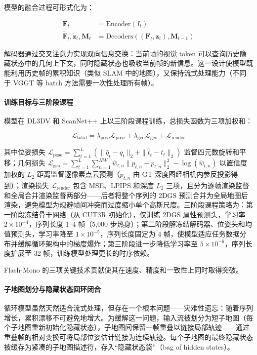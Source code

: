 模型的融合过程可形式化为：

\begin{align}
\mathbf{F}_t &= \mathrm{Encoder}(I_t) \\
\tilde{\mathbf{F}}_t, \tilde{\mathbf{z}}_t, \mathbf{M}_t &= \mathrm{Decoders}((\mathbf{F}_t, \mathbf{z}_t), \mathbf{M}_{t-1})
\end{align}

解码器通过交叉注意力实现双向信息交换：当前帧的视觉 token 可以查询历史隐藏状态中的几何上下文，同时隐藏状态也吸收当前帧的新信息。这一设计使模型既能利用历史帧的累积知识（类似 SLAM 中的地图），又保持流式处理能力（不同于 VGGT 等 batch 方法需要一次性处理所有帧）。

\paragraph{训练目标与三阶段课程}模型在 DL3DV 和 ScanNet++ 上以三阶段课程训练，总损失函数为三项加权和：

\begin{equation}
\mathcal{L}_{\mathrm{total}} = \lambda_{\mathrm{pose}}\mathcal{L}_{\mathrm{pose}} + \lambda_{\mathrm{geo}}\mathcal{L}_{\mathrm{geo}} + \mathcal{L}_{\mathrm{render}}
\end{equation}

其中位姿损失 $\mathcal{L}_{\mathrm{pose}} = \sum_{t=1}^{L}(\|\hat{q}_t - q_t\|_2 + \|\hat{t}_t - t_t\|_2)$ 监督四元数旋转和平移；几何损失 $\mathcal{L}_{\mathrm{geo}} = \sum_{t=1}^{L}\sum_{n=1}^{HW}\hat{w}_{t,n}\|\hat{p}_{t,n} - p_{t,n}\|_2^2 - \log(\hat{w}_{t,n})$ 以置信度加权的 $L_2$ 距离监督逐像素点云预测（$p_{t,n}$ 由 GT 深度图经相机内参反投影得到）；渲染损失 $\mathcal{L}_{\mathrm{render}}$ 包含 MSE、LPIPS 和深度 $L_2$ 三项，且分为逐帧渲染监督和全局合并渲染监督两部分——后者将整个序列的 2DGS 预测合并为全局地图后渲染，避免模型为规避帧间冲突而过度缩小单个高斯尺度。三阶段课程策略为：第一阶段冻结骨干网络（从 CUT3R 初始化），仅训练 2DGS 属性预测头，学习率 $2 \times 10^{-4}$，序列长度 1--4 帧（5,000 步热身）；第二阶段解冻结解码器、位姿头和均值预测头，学习率降至 $1 \times 10^{-5}$，序列长度固定为 4 帧，使模型适应任务数据分布并缓解循环架构中的梯度爆炸；第三阶段进一步降低学习率至 $5 \times 10^{-6}$，序列长度扩展至 32 帧，训练模型处理更长的时序依赖。

Flash-Mono 的三项关键技术贡献使其在速度、精度和一致性上同时取得突破。

\paragraph{子地图划分与隐藏状态回环闭合}
循环模型虽然天然适合流式处理，但存在一个根本问题——灾难性遗忘：随着序列增长，累积漂移不可避免地增大。为缓解这一问题，输入流被划分为短子地图（每个子地图重新初始化隐藏状态），子地图间保留一帧重叠以链接局部轨迹——通过重叠帧的相对变换可将局部位姿估计链接为连续轨迹。每个子地图的最终隐藏状态被缓存为紧凑的子地图描述符，存入``隐藏状态袋''（bag of hidden states）。

